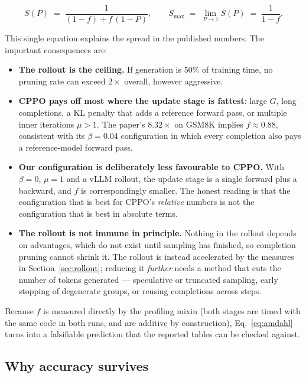\documentclass[11pt,a4paper]{article}
\begin{document}
\begin{equation}
\label{eq:amdahl}
S(P) \;=\; \frac{1}{(1-f) + f\,(1-P)}, \qquad
S_{\max} \;=\; \lim_{P \to 1} S(P) \;=\; \frac{1}{1-f}.
\end{equation}

This single equation explains the spread in the published numbers. The
important consequences are:

\begin{itemize}
  \item \textbf{The rollout is the ceiling.} If generation is 50\% of training
  time, no pruning rate can exceed $2\times$ overall, however aggressive.
  \item \textbf{CPPO pays off most where the update stage is fattest}: large
  $G$, long completions, a KL penalty that adds a reference forward pass, or
  multiple inner iterations $\mu > 1$. The paper's $8.32\times$ on GSM8K
  implies $f \approx 0.88$, consistent with its $\beta = 0.04$ configuration
  in which every completion also pays a reference-model forward pass.
  \item \textbf{Our configuration is deliberately less favourable to CPPO.}
  With $\beta = 0$, $\mu = 1$ and a vLLM rollout, the update stage is a single
  forward plus a backward, and $f$ is correspondingly smaller. The honest
  reading is that the configuration that is best for CPPO's \emph{relative}
  numbers is not the configuration that is best in absolute terms.
  \item \textbf{The rollout is not immune in principle.} Nothing in the
  rollout depends on advantages, which do not exist until sampling has
  finished, so completion pruning cannot shrink it. The rollout is instead
  accelerated by the measures in Section~\ref{sec:rollout}; reducing it
  \emph{further} needs a method that cuts the number of tokens generated ---
  speculative or truncated sampling, early stopping of degenerate groups, or
  reusing completions across steps.
\end{itemize}

Because $f$ is measured directly by the profiling mixin (both stages are
timed with the same code in both runs, and are additive by construction),
Eq.~\eqref{eq:amdahl} turns into a falsifiable prediction that the reported
tables can be checked against.

\subsection{Why accuracy survives}
\end{document}
